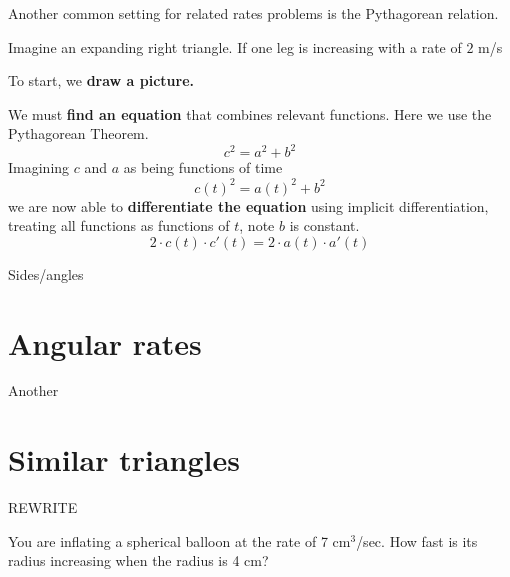 \documentclass{ximera}
\begin{document}
Another common setting for related rates problems is the Pythagorean
relation.

\begin{example}
  Imagine an expanding right triangle. If one leg is increasing with a
  rate of $2$ m/s
  \begin{explanation}
    To start, we \textbf{draw a picture.}


    We must \textbf{find an equation} that combines relevant
    functions. Here we use the Pythagorean Theorem.
    \[
    c^2 = a^2 + b^2
    \]
    Imagining $c$ and $a$ as being functions of time
    \[
    c(t)^2 = a(t)^2 + b^2
    \]
    we are now able to \textbf{differentiate the equation} using
    implicit differentiation, treating all functions as functions of
    $t$, note $b$ is constant.
    \[
    2\cdot c(t)\cdot c'(t) = 2\cdot a(t)\cdot a'(t)
    \]
  \end{explanation}
\end{example}

Sides/angles


\section{Angular rates}

Another 

\section{Similar triangles}


REWRITE

\begin{example}
You are inflating a spherical balloon at the rate of 7 cm${}^3$/sec.  How
fast is its radius increasing when the radius is 4 cm?
\end{example}
\end{document}
